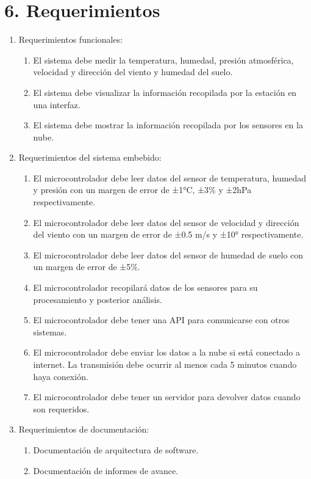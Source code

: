 \documentclass[
11pt, %
codirector, %
]{charter}
\begin{document}
\section{6. Requerimientos}
\label{sec:requerimientos}

\begin{enumerate}
	\item Requerimientos funcionales:
		\begin{enumerate}
			\item El sistema debe medir la temperatura, humedad, presión atmosférica, velocidad y dirección del viento y humedad del suelo.
			\item El sistema debe visualizar la información recopilada por la estación en una interfaz.
			\item El sistema debe mostrar la información recopilada por los sensores en la nube. 
		\end{enumerate}
	\item Requerimientos del sistema embebido:
		\begin{enumerate}
			\item El microcontrolador debe leer datos del sensor de temperatura, humedad y presión con un margen de error de ±1°C, ±3\% y ±2hPa respectivamente.
			\item El microcontrolador debe leer datos del sensor de velocidad y dirección del viento con un margen de error de ±0.5 m/s y ±10° respectivamente.
			\item El microcontrolador debe leer datos del sensor de humedad de suelo con un margen de error de ±5\%.	
			\item El microcontrolador recopilará datos de los sensores para su procesamiento y posterior análisis.
			\item El microcontrolador debe tener una API para comunicarse con otros sistemas.
			\item El microcontrolador debe enviar los datos a la nube si está conectado a internet. La transmisión debe ocurrir al menos cada 5 minutos cuando haya conexión.
			\item El microcontrolador debe tener un servidor para devolver datos cuando son requeridos.
		\end{enumerate}
	\newpage
	\item Requerimientos de documentación:
		\begin{enumerate}
			\item Documentación de arquitectura de software.
			\item Documentación de informes de avance.

\end{enumerate}
\end{enumerate}
\end{document}
